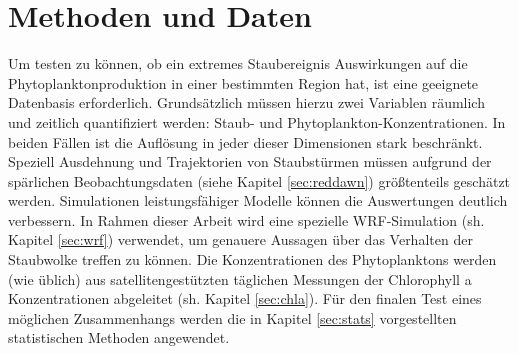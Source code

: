 \documentclass[12pt,a4paper,onecolumn,draft]{scrartcl}
\begin{document}
\section{Methoden und Daten} \label{sec:Methoden}
Um testen zu können, ob ein extremes Staubereignis Auswirkungen auf die Phytoplanktonproduktion in einer bestimmten Region hat, ist eine geeignete Datenbasis erforderlich. Grundsätzlich müssen hierzu zwei Variablen räumlich und zeitlich quantifiziert werden: Staub- und Phytoplankton-Konzentrationen. In beiden Fällen ist die Auflösung in jeder dieser Dimensionen stark beschränkt. Speziell Ausdehnung und Trajektorien von Staubstürmen müssen aufgrund der spärlichen Beobachtungsdaten (siehe Kapitel  \ref{sec:reddawn}) größtenteils geschätzt werden. Simulationen leistungsfähiger Modelle können die Auswertungen deutlich verbessern. In Rahmen dieser Arbeit wird eine spezielle WRF-Simulation (sh. Kapitel \ref{sec:wrf}) verwendet, um genauere Aussagen über das Verhalten der Staubwolke treffen zu können. Die Konzentrationen des Phytoplanktons werden (wie üblich) aus satellitengestützten täglichen Messungen der Chlorophyll a Konzentrationen abgeleitet (sh. Kapitel \ref{sec:chla}). Für den finalen Test eines möglichen Zusammenhangs werden die in Kapitel \ref{sec:stats} vorgestellten statistischen Methoden angewendet.
\end{document}
